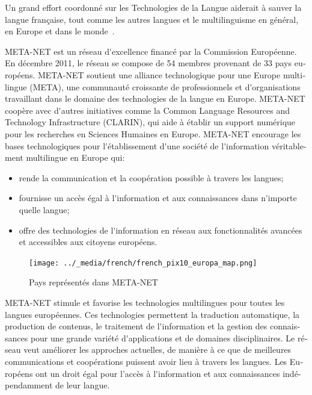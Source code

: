 \begin{french}
\begin{multicols}{2}
Un grand effort coordonné sur les Technologies de la Langue aiderait à
sauver la langue française, tout comme les autres langues et le
multilinguisme en général, en Europe et dans le monde~\cite{worldconclusion}.

\end{multicols}

\clearpage


\begin{multicols}{2}
META-NET est un réseau d{\mbox '}excellence financé par la Commission Européenne. En décembre 2011, le réseau se compose de 54 membres provenant de 33 pays européens. META-NET soutient une alliance technologique pour une Europe multilingue (META), une communauté croissante de professionnels et d{\mbox '}organisations travaillant dans le domaine des technologies de la langue en Europe. META-NET coopère avec d{\mbox '}autres initiatives comme la Common Language Resources and Technology Infrastructure  (CLARIN), qui aide à établir un support numérique pour les recherches en Sciences Humaines en Europe. META-NET encourage les bases technologiques pour l{\mbox '}établissement d{\mbox '}une société de l{\mbox '}information véritablement multilingue en Europe qui:

\begin{itemize}
\item rende la communication et la coopération possible à travers les langues; 
\item fournisse un accès égal à l{\mbox '}information et aux connaissances dans n{\mbox '}importe quelle langue; 
\item offre des technologies de l{\mbox '}information en réseau aux fonctionnalités avancées et accessibles aux citoyens européens.
\end{itemize}

\begin{figure}[!ht]
\begin{center}
  \texttt{[image: ../\_media/french/french\_pix10\_europa\_map.png]}
  \caption{Pays représentés dans META-NET}
  \label{fig:metanet_countries}
\end{center}
\end{figure}

META-NET stimule et favorise les technologies multilingues pour toutes les langues européennes. Ces technologies permettent la traduction automatique, la production de contenus, le traitement de l{\mbox '}information et la gestion des connaissances pour une grande variété d{\mbox '}applications et de domaines disciplinaires. Le réseau veut améliorer les approches actuelles, de manière à ce que de meilleures communications et coopérations puissent avoir lieu à travers les langues. Les Européens ont un droit égal pour l'accès à l{\mbox '}information et aux connaissances indépendamment de leur langue. 


\end{multicols}
\end{french}
